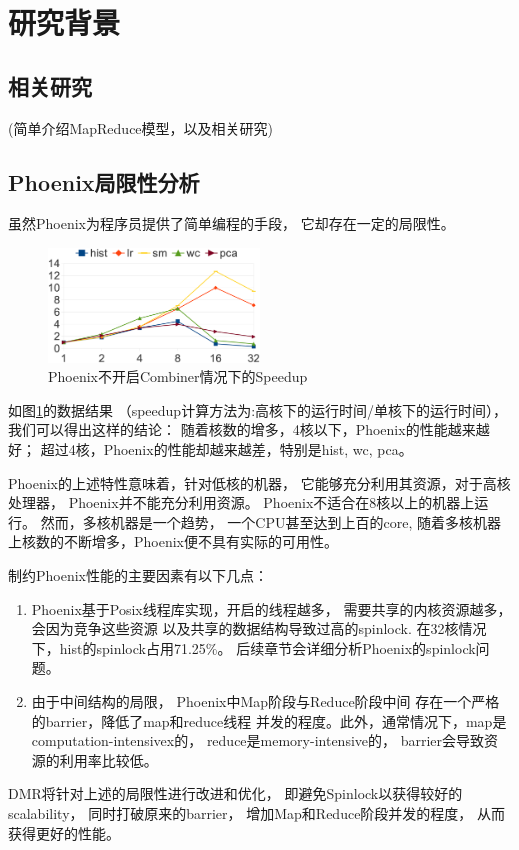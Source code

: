\section{研究背景}


\subsection{相关研究}
(简单介绍MapReduce模型，以及相关研究)


\subsection{Phoenix局限性分析}
虽然Phoenix为程序员提供了简单编程的手段，
它却存在一定的局限性。
\begin{figure}[!h!t]  
    \centering
    \includegraphics[width=0.5\textwidth]{img/phoenix_speedup.eps}
    \caption{Phoenix不开启Combiner情况下的Speedup}
    \label{phoenix:speedup}
\end{figure}
如图\ref{phoenix:speedup}的数据结果
（speedup计算方法为:高核下的运行时间/单核下的运行时间），
我们可以得出这样的结论：
随着核数的增多，4核以下，Phoenix的性能越来越好；
超过4核，Phoenix的性能却越来越差，特别是hist, wc, pca。

Phoenix的上述特性意味着，针对低核的机器，
它能够充分利用其资源，对于高核处理器，
Phoenix并不能充分利用资源。
Phoenix不适合在8核以上的机器上运行。
然而，多核机器是一个趋势，
一个CPU甚至达到上百的core\cite{Borkar2007Thousand},
随着多核机器上核数的不断增多，Phoenix便不具有实际的可用性。

制约Phoenix性能的主要因素有以下几点：
\begin{enumerate}
  \item Phoenix基于Posix线程库实现，开启的线程越多，
  需要共享的内核资源越多，会因为竞争这些资源
  以及共享的数据结构导致过高的spinlock.
  在32核情况下，hist的spinlock占用71.25\%。
  后续章节会详细分析Phoenix的spinlock问题。
  
  \item 由于中间结构的局限，
  Phoenix中Map阶段与Reduce阶段中间
  存在一个严格的barrier，降低了map和reduce线程
  并发的程度。此外，通常情况下，map是computation-intensivex的，
  reduce是memory-intensive的\cite{talbot2011phoenix++}，
  barrier会导致资源的利用率比较低。
\end{enumerate}

DMR将针对上述的局限性进行改进和优化，
即避免Spinlock以获得较好的scalability，
同时打破原来的barrier，
增加Map和Reduce阶段并发的程度，
从而获得更好的性能。





  
